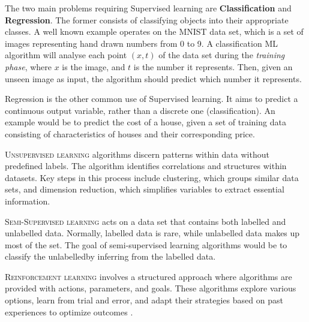 \documentclass{article}
\begin{document}
  The two main problems requiring Supervised learning are \textbf{Classification} and \textbf{Regression}. The former consists of classifying objects into their appropriate classes. A well known example operates on the MNIST data set, which is a set of images representing hand drawn numbers from 0 to 9. A classification ML algorithm will analyse each point $(x,t)$ of the data set during the \textit{training phase}, where $x$ is the image, and $t$ is the number it represents. Then, given an unseen image as input, the algorithm should predict which number it represents.

  Regression is the other common use of Supervised learning. It aims to predict a continuous output variable, rather than a discrete one (classification). An example would be to predict the cost of a house, given a set of training data consisting of characteristics of houses and their corresponding price.

\vspace{4mm}
\noindent\textsc{Unsupervised learning} algorithms discern patterns within data without predefined labels. The algorithm identifies correlations and structures within datasets. Key steps in this process include clustering, which groups similar data sets, and dimension reduction, which simplifies variables to extract essential information. 

\vspace{4mm}
\noindent\textsc{Semi-Supervised learning} acts on a data set that contains both labelled and unlabelled data. Normally, labelled data is rare, while unlabelled data makes up most of the set. The goal of semi-supervised learning algorithms would be to classify the unlabelledby inferring from the labelled data.

\vspace{4mm}
\noindent\textsc{Reinforcement learning} involves a structured approach where algorithms are provided with actions, parameters, and goals. These algorithms explore various options, learn from trial and error, and adapt their strategies based on past experiences to optimize outcomes \citep{GuideML}.
\end{document}
